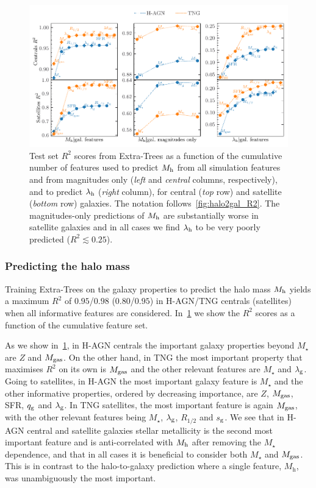 \documentclass[usenatbib,useAMS]{mnras}
\begin{document}
\begin{figure}
    \centering
    \includegraphics[width=\textwidth]{Figures/haloR2s.pdf}
    \caption{Test set $R^2$ scores from Extra-Trees as a function of the cumulative number of features used to predict $M_{\rm h}$ from all simulation features and from magnitudes only (\emph{left} and \emph{central} columns, respectively), and to predict $\lambda_{\rm h}$ (\emph{right} column), for central (\emph{top} row) and satellite (\emph{bottom} row) galaxies. The notation follows~\cref{fig:halo2gal_R2}.
    The magnitudes-only predictions of $M_{\rm h}$ are substantially worse in satellite galaxies and in all cases we find $\lambda_{\rm h}$ to be very poorly predicted ($R^2 \lesssim 0.25$).}
    \label{fig:gal2halo_R2s}
\end{figure}



\subsubsection{Predicting the halo mass}\label{sec:predMhalo}

Training Extra-Trees on the galaxy properties to predict the halo mass $M_{\rm h}$ yields a maximum $R^2$ of $0.95$/$0.98$ ($0.80$/$0.95$) in H-AGN/TNG centrals (satellites) when all informative features are considered. In~\cref{fig:gal2halo_R2s} we show the $R^2$ scores as a function of the cumulative feature set.

As we show in~\cref{fig:gal2halo_R2s}, in H-AGN centrals the important galaxy properties beyond $M_\star$ are $Z$ and $M_{\rm gas}$. On the other hand, in TNG the most important property that maximises $R^2$ on its own is $M_{\rm gas}$ and the other relevant features are $M_\star$ and $\lambda_{\rm g}$. Going to satellites, in H-AGN  the most important galaxy feature is $M_\star$ and the other informative properties, ordered by decreasing importance, are $Z$, $M_{\rm gas}$, SFR, $q_{\rm g}$ and $\lambda_{\rm g}$. In TNG satellites, the most important feature is again $M_{\rm gas}$, with the other relevant features being $M_\star$, $\lambda_{\rm g}$, $R_{1/2}$ and $s_{\rm g}$. We see that in H-AGN central and satellite galaxies stellar metallicity is the second most important feature and is anti-correlated with $M_{\rm h}$ after removing the $M_\star$ dependence, and that in all cases it is beneficial to consider both $M_\star$ and $M_{\rm gas}$. This is in contrast to the halo-to-galaxy prediction where a single feature, $M_\text{h}$, was unambiguously the most important.
\end{document}
